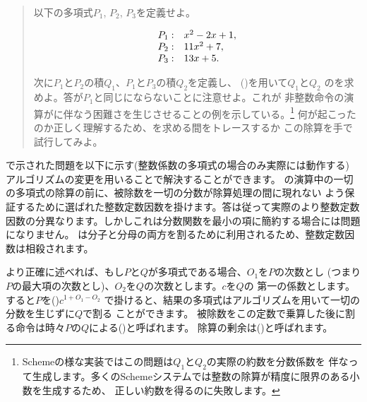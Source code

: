 \begin{quote}
以下の多項式\( P_1 \), \( P_2 \), \( P_3 \)を定義せよ。
\begin{comment}

\begin{example}
P_1 : x^2 - 2x + 1

P_2 : 11x^2 + 7

P_3 : 13x + 5
\end{example}

\end{comment}
\begin{displaymath}
\begin{array}{l@{{}:}l}
	P_1 	& \quad x^2 - 2x + 1, \\
	P_2 	& \quad 11x^2 + 7, \\
	P_3 	& \quad 13x + 5. 
\end{array}
\end{displaymath}


次に\( P_1 \)と\( P_2 \)の積\( Q_1 \)、\( P_1 \)と\( P_3 \)の積\( Q_2 \)を定義し、
()を用いて\( Q_1 \)と\( Q_2 \)
のを求めよ。答が\( P_1 \)と同じにならないことに注意せよ。これが
非整数命令の演算がに伴なう困難さを生じさせることの例を示している。\footnote{
 Schemeの様な実装ではこの問題は\( Q_1 \)と\( Q_2 \)の実際の約数を分数係数を
伴なって生成します。多くのSchemeシステムでは整数の除算が精度に限界のある小数を生成するため、
正しい約数を得るのに失敗します。}
何が起こったのか正しく理解するため、を求める間をトレースするか
この除算を手で試行してみよ。
\end{quote}

\noindent
{}で示された問題を以下に示す(整数係数の多項式の場合のみ実際には動作する)
アルゴリズムの変更を用いることで解決することができます。
の演算中の一切の多項式の除算の前に、被除数を一切の分数が除算処理の間に現れない
よう保証するために選ばれた整数定数因数を掛けます。答は従って実際のより整数定数
因数の分異なります。しかしこれは分数関数を最小の項に簡約する場合には問題になりません。
は分子と分母の両方を割るために利用されるため、整数定数因数は相殺されます。



より正確に述べれば、もし\( P \)と\( Q \)が多項式である場合、\( O_1 \)を\( P \)の次数とし
(つまり\( P \)の最大項の次数とし)、\( O_2 \)を\( Q \)の次数とします。\( c \)を\( Q \)の
第一の係数とします。すると\( P \)を()\( c^{1 + O_1 - O_2} \)
で掛けると、結果の多項式はアルゴリズムを用いて一切の分数を生じずに\( Q \)で割る
ことができます。
被除数をこの定数で乗算した後に割る命令は時々\( P \)の\( Q \)による()と呼ばれます。
除算の剰余は()と呼ばれます。

